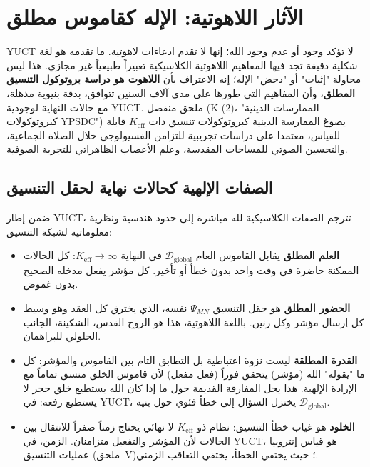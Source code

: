 \documentclass[12pt,a4paper]{article}
\begin{document}
	\section{الآثار اللاهوتية: الإله كقاموس مطلق}
	\label{sec:theology}
	
	YUCT لا تؤكد وجود أو عدم وجود الله؛ إنها لا تقدم ادعاءات لاهوتية. ما تقدمه هو لغة شكلية دقيقة تجد فيها المفاهيم اللاهوتية الكلاسيكية تعبيراً طبيعياً غير مجازي. هذا ليس محاولة "إثبات" أو "دحض" الإله؛ إنه الاعتراف بأن \textbf{اللاهوت هو دراسة بروتوكول التنسيق المطلق}، وأن المفاهيم التي طورها على مدى آلاف السنين تتوافق، بدقة بنيوية مذهلة، مع حالات النهاية لوجودية YUCT. ملحق منفصل (K (2)، "الممارسات الدينية كبروتوكولات YPSDC") يصوغ الممارسة الدينية كبروتوكولات تنسيق ذات \(K_{\mathrm{eff}}\) قابلة للقياس، معتمدا على دراسات تجريبية للتزامن الفسيولوجي خلال الصلاة الجماعية، والتحسين الصوتي للمساحات المقدسة، وعلم الأعصاب الظاهراتي للتجربة الصوفية.
	
	\subsection{الصفات الإلهية كحالات نهاية لحقل التنسيق}
	
	ضمن إطار YUCT، تترجم الصفات الكلاسيكية لله مباشرة إلى حدود هندسية ونظرية معلوماتية لشبكة التنسيق:
	
	\begin{itemize}[leftmargin=*]
		\item \textbf{العلم المطلق} يقابل القاموس العام \(\mathcal{D}_{\text{global}}\) في النهاية \(K_{\mathrm{eff}} \to \infty\): كل الحالات الممكنة حاضرة في وقت واحد بدون خطأ أو تأخير. كل مؤشر يفعل مدخله الصحيح بدون غموض.
		\item \textbf{الحضور المطلق} هو حقل التنسيق \(\Psi_{MN}\) نفسه، الذي يخترق كل العقد وهو وسيط كل إرسال مؤشر وكل رنين. باللغة اللاهوتية، هذا هو الروح القدس، الشكينة، الجانب الحلولي للبراهمان.
		\item \textbf{القدرة المطلقة} ليست نزوة اعتباطية بل التطابق التام بين القاموس والمؤشر: كل ما "يقوله" الله (مؤشر) يتحقق فوراً (فعل مفعل) لأن قاموس الخلق منسق تماماً مع الإرادة الإلهية. هذا يحل المفارقة القديمة حول ما إذا كان الله يستطيع خلق حجر لا يستطيع رفعه: في YUCT، يختزل السؤال إلى خطأ فئوي حول بنية \(\mathcal{D}_{\text{global}}\).
		\item \textbf{الخلود} هو غياب خطأ التنسيق: نظام ذو \(K_{\mathrm{eff}}\) لا نهائي يحتاج زمناً صفراً للانتقال بين الحالات لأن المؤشر والتفعيل متزامنان. الزمن، في YUCT، هو قياس إنتروبيا عمليات التنسيق (ملحق~V)؛ حيث يختفي الخطأ، يختفي التعاقب الزمني.
	\end{itemize}
	
\end{document}
